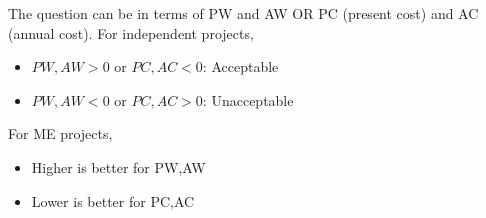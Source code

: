 \begin{warning}
    The question can be in terms of PW and AW OR PC (present cost) and AC (annual cost). For independent projects,
    \begin{itemize}
        \item $PW,AW>0$ or $PC,AC<0$: Acceptable
        \item $PW,AW<0$ or $PC,AC>0$: Unacceptable
    \end{itemize}

    For ME projects, 
    \begin{itemize}
        \item Higher is better for PW,AW
        \item Lower is better for PC,AC
    \end{itemize}
\end{warning}